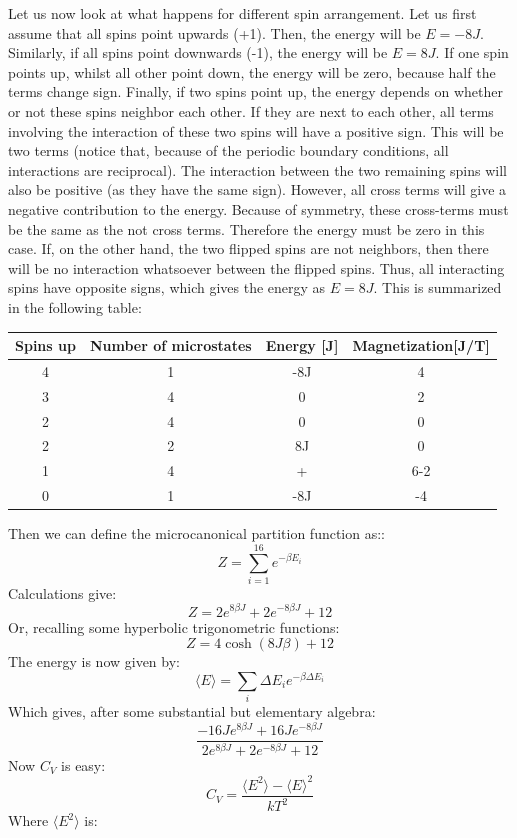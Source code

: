 \documentclass[a4paper, 10pt]{article}
\begin{document}
Let us now look at what happens for different spin arrangement. Let us first assume that all spins point upwards (+1). Then, the energy will be $E=-8J$. Similarly, if all spins point downwards (-1), the energy will be $E=8J$. If one spin points up, whilst all other point down, the energy will be zero, because half the terms change sign. Finally, if two spins point up, the energy depends on whether or not these spins neighbor each other. If they are next to each other, all terms involving the interaction of these two spins will have a positive sign. This will be two terms (notice that, because of the periodic boundary conditions, all interactions are reciprocal). The interaction between the two remaining spins will also be positive (as they have the same sign). However, all cross terms will give a negative contribution to the energy. Because of symmetry, these cross-terms must be the same as the not cross terms. Therefore the energy must be zero in this case. If, on the other hand, the two flipped spins are not neighbors, then there will be no interaction whatsoever between the flipped spins. Thus, all interacting spins have opposite signs, which gives the energy as $E=8J$. This is summarized in the following table:
\begin{center}
\begin{tabular}{|c|ccc|}
\hline
Spins up &Number of microstates&  Energy [J]& Magnetization[J/T]\\
\hline
4 & 1 &-8J&4\\
3 & 4 &0 & 2\\
2 &4 &0 &0 \\
2 & 2& 8J & 0\\
1 &4&+&6-2\\
0 & 1&-8J & -4 \\
\hline
\end{tabular}
\end{center}
Then we can define the microcanonical partition function as::
$$Z=\sum_{i=1}^{16} e^{-\beta E_i}$$
Calculations give:
$$Z=2e^{8\beta J}+2e^{-8\beta J} + 12$$
Or, recalling some hyperbolic trigonometric functions:
$$Z=4\cosh (8J\beta) +12$$
The energy is now given by:
\begin{equation}
\langle E \rangle = \sum_i \Delta E_i e^{-\beta \Delta E_i}
\end{equation}
Which gives, after some substantial but elementary algebra:
$$\frac{-16Je^{8\beta J}+16Je^{-8\beta J}}{2e^{8\beta J}+2e^{-8\beta J}+12}$$
Now $C_V$ is easy:
$$C_V=\frac{\langle E^2 \rangle - \langle E \rangle^2}{kT^2}$$
Where $\langle E^2 \rangle$ is:
\end{document}
